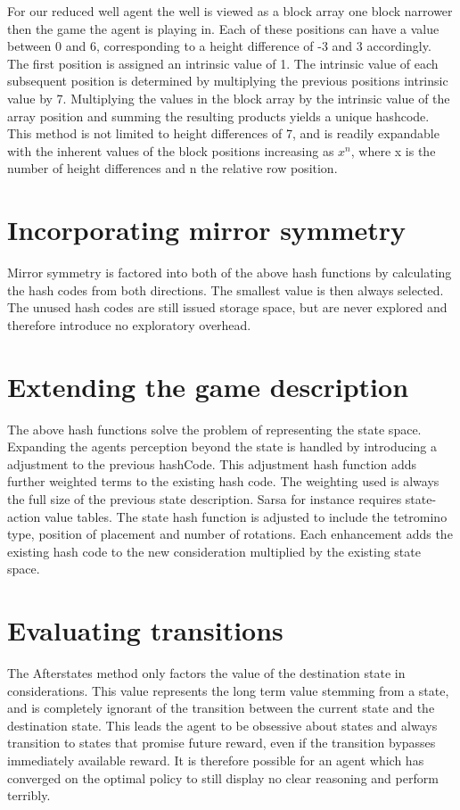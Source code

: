\documentclass{rucsthesis}
\begin{document}
For our reduced well agent the well is viewed as a block array one block narrower then the game the agent is playing in. Each of these positions can have a value between 0 and 6, corresponding to a height difference of -3 and 3 accordingly. The first position is assigned an intrinsic value of 1. The intrinsic value of each subsequent position is determined by multiplying the previous positions intrinsic value by 7. Multiplying the values in the block array by the intrinsic value of the array position and summing the resulting products yields a unique hashcode. This method is not limited to height differences of 7, and is readily expandable with the inherent values of the block positions increasing as $x^n$, where x is the number of height differences and n the relative row position.

\section{Incorporating mirror symmetry}

Mirror symmetry is factored into both of the above hash functions by calculating the hash codes from both directions. The smallest value is then always selected. The unused hash codes are still issued storage space, but are never explored and therefore introduce no exploratory overhead.

\section{Extending the game description}

The above hash functions solve the problem of representing the state space. Expanding the agents perception beyond the state is handled by introducing a adjustment to the previous hashCode. This adjustment hash function adds further weighted terms to the existing hash code. The weighting used is always the full size of the previous state description. Sarsa for instance requires state-action value tables. The state hash function is adjusted to include the tetromino type, position of placement and number of rotations. Each enhancement adds the existing hash code to the new consideration multiplied by the existing state space. 

\section{Evaluating transitions}

The Afterstates method only factors the value of the destination state in considerations. This value represents the long term value stemming from a state, and is completely ignorant of the transition between the current state and the destination state. This leads the agent to be obsessive about states and always transition to states that promise future reward, even if the transition bypasses immediately available reward. It is therefore possible for an agent which has converged on the optimal policy to still display no clear reasoning and perform terribly. 
\end{document}
